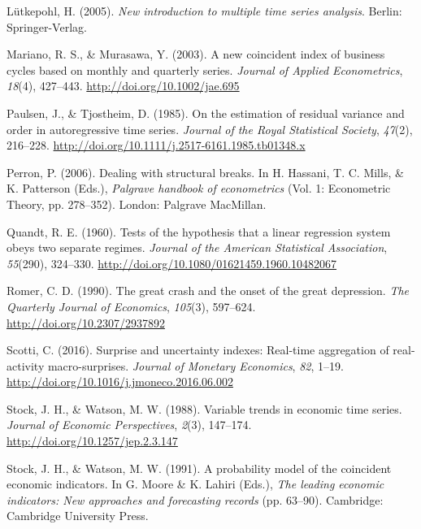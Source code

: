 \documentclass[12pt,twoside]{reedthesis}
\begin{document}
\leavevmode\hypertarget{ref-lutkepohl:2005}{}%
Lütkepohl, H. (2005). \emph{New introduction to multiple time series analysis}. Berlin: Springer-Verlag.

\leavevmode\hypertarget{ref-marimura:2003}{}%
Mariano, R. S., \& Murasawa, Y. (2003). A new coincident index of business cycles based on monthly and quarterly series. \emph{Journal of Applied Econometrics}, \emph{18}(4), 427--443. \url{http://doi.org/10.1002/jae.695}

\leavevmode\hypertarget{ref-paultjos:1985}{}%
Paulsen, J., \& Tjostheim, D. (1985). On the estimation of residual variance and order in autoregressive time series. \emph{Journal of the Royal Statistical Society}, \emph{47}(2), 216--228. \url{http://doi.org/10.1111/j.2517-6161.1985.tb01348.x}

\leavevmode\hypertarget{ref-perron:2006}{}%
Perron, P. (2006). Dealing with structural breaks. In H. Hassani, T. C. Mills, \& K. Patterson (Eds.), \emph{Palgrave handbook of econometrics} (Vol. 1: Econometric Theory, pp. 278--352). London: Palgrave MacMillan.

\leavevmode\hypertarget{ref-quandt:1960}{}%
Quandt, R. E. (1960). Tests of the hypothesis that a linear regression system obeys two separate regimes. \emph{Journal of the American Statistical Association}, \emph{55}(290), 324--330. \url{http://doi.org/10.1080/01621459.1960.10482067}

\leavevmode\hypertarget{ref-romer:1990}{}%
Romer, C. D. (1990). The great crash and the onset of the great depression. \emph{The Quarterly Journal of Economics}, \emph{105}(3), 597--624. \url{http://doi.org/10.2307/2937892}

\leavevmode\hypertarget{ref-scotti:2016}{}%
Scotti, C. (2016). Surprise and uncertainty indexes: Real-time aggregation of real-activity macro-surprises. \emph{Journal of Monetary Economics}, \emph{82}, 1--19. \url{http://doi.org/10.1016/j.jmoneco.2016.06.002}

\leavevmode\hypertarget{ref-stocwats:1988}{}%
Stock, J. H., \& Watson, M. W. (1988). Variable trends in economic time series. \emph{Journal of Economic Perspectives}, \emph{2}(3), 147--174. \url{http://doi.org/10.1257/jep.2.3.147}

\leavevmode\hypertarget{ref-stocwats:1991}{}%
Stock, J. H., \& Watson, M. W. (1991). A probability model of the coincident economic indicators. In G. Moore \& K. Lahiri (Eds.), \emph{The leading economic indicators: New approaches and forecasting records} (pp. 63--90). Cambridge: Cambridge University Press.
\end{document}
